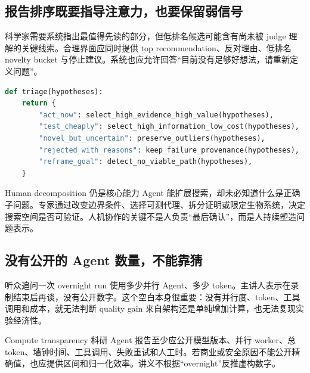 \subsection{报告排序既要指导注意力，也要保留弱信号}

科学家需要系统指出最值得先读的部分，但低排名候选可能含有尚未被 judge 理解的关键线索。合理界面应同时提供 top recommendation、反对理由、低排名 novelty bucket 与停止建议。系统也应允许回答“目前没有足够好想法，请重新定义问题”。

\begin{lstlisting}[language=Python,caption={兼顾优先级与弱信号的报告分层}]
def triage(hypotheses):
    return {
        "act_now": select_high_evidence_high_value(hypotheses),
        "test_cheaply": select_high_information_low_cost(hypotheses),
        "novel_but_uncertain": preserve_outliers(hypotheses),
        "rejected_with_reasons": keep_failure_provenance(hypotheses),
        "reframe_goal": detect_no_viable_path(hypotheses),
    }
\end{lstlisting}


\begin{importantbox}{Human decomposition 仍是核心能力}
Agent 能扩展搜索，却未必知道什么是正确子问题。专家通过改变边界条件、选择可测代理、拆分证明或限定生物系统，决定搜索空间是否可验证。人机协作的关键不是人负责“最后确认”，而是人持续塑造问题表示。
\end{importantbox}

\subsection{没有公开的 Agent 数量，不能靠猜}

听众追问一次 overnight run 使用多少并行 Agent、多少 token。主讲人表示在录制结束后再谈，没有公开数字。这个空白本身很重要：没有并行度、token、工具调用和成本，就无法判断 quality gain 来自架构还是单纯增加计算，也无法复现实验经济性。

\begin{warningbox}{Compute transparency}
科研 Agent 报告至少应公开模型版本、并行 worker、总 token、墙钟时间、工具调用、失败重试和人工时。若商业或安全原因不能公开精确值，也应提供区间和归一化效率。讲义不根据“overnight”反推虚构数字。
\end{warningbox}


